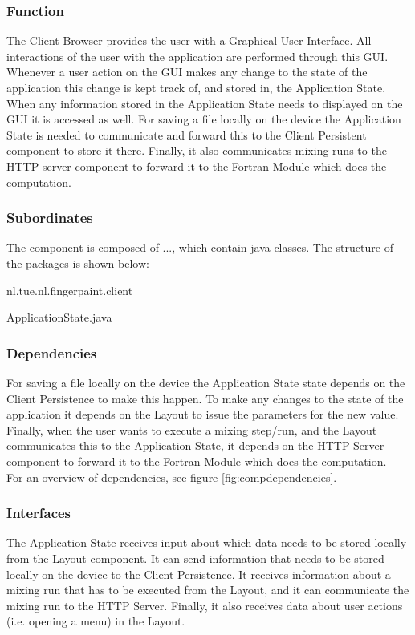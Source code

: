 \subsubsection*{Function}
The Client Browser provides the user with a Graphical User Interface. All interactions of the user with the application are performed through this GUI. Whenever a user action on the GUI makes any change to the state of the application this change is kept track of, and stored in, the Application State. When any information stored in the Application State needs to displayed on the GUI it is accessed as well. For saving a file locally on the device the Application State is needed to communicate and forward this to the Client Persistent component to store it there. Finally, it also communicates mixing runs to the HTTP server component to forward it to the Fortran Module which does the computation.

\subsubsection*{Subordinates}
The component is composed of ..., which contain java classes. The structure of the packages is shown below:
\fpstartparagraph{} \begin{itemize}
nl.tue.nl.fingerpaint.client
\begin{itemize}
ApplicationState.java
\end{itemize}
\end{itemize}

\subsubsection*{Dependencies}
For saving a file locally on the device the Application State state depends on the Client Persistence to make this happen. To make any changes to the state of the application it depends on the Layout to issue the parameters for the new value. Finally, when the user wants to execute a mixing step/run, and the Layout communicates this to the Application State, it depends on the HTTP Server component to forward it to the Fortran Module which does the computation. \\

\noindent For an overview of dependencies, see figure \ref{fig:compdependencies}.

\subsubsection*{Interfaces}
The Application State receives input about which data needs to be stored locally from the Layout component. It can send information that needs to be stored locally on the device to the Client Persistence. It receives information about a mixing run that has to be executed from the Layout, and it can communicate the mixing run to the HTTP Server. Finally, it also receives data about user actions (i.e. opening a menu) in the Layout.

